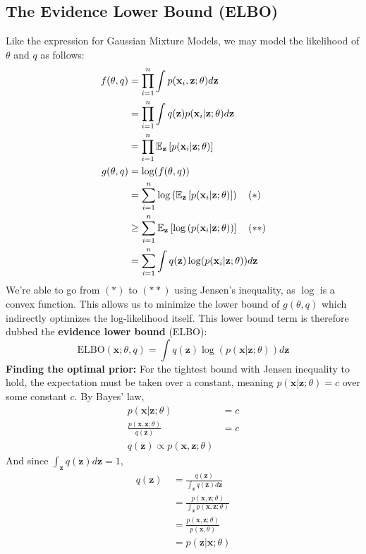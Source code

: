 \subsection{The Evidence Lower Bound (ELBO)}
Like the expression for Gaussian Mixture Models, we may model the likelihood of $\theta$ and $q$ as follows:
\begin{align*}
        f(\theta,q) 
        &= \prod_{i=1}^n \int p(\mathbf{x}_i,\mathbf{z};\theta)d\mathbf{z}\\
        &= \prod_{i=1}^n \int q(\mathbf{z}) p(\mathbf{x}_i|\mathbf{z};\theta)d\mathbf{z}\\
        &= \prod_{i=1}^n \mathbb{E}_\mathbf{z}\left[p(\mathbf{x}_i|\mathbf{z};\theta)\right]\\
        g(\theta,q) 
        &= \log(f(\theta,q)) \\
        &= \sum_{i=1}^n \log\left(\mathbb{E}_\mathbf{z}\left[p(\mathbf{x}_i|\mathbf{z};\theta)\right]\right) \quad (*) \\
        &\ge \sum_{i=1}^n \mathbb{E}_\mathbf{z}\left[\log\left(p(\mathbf{x}_i|\mathbf{z};\theta)\right)\right] \quad (**) \\
        &= \sum_{i=1}^n \int q(\mathbf{z}) \log(p(\mathbf{x}_i|\mathbf{z};\theta)) d\mathbf{z}
\end{align*}
We're able to go from $(*)$ to $(**)$ using Jensen's inequality, as $\log$ is a convex function. This allows us to minimize the lower bound of $g(\theta,q)$ which indirectly optimizes the log-likelihood itself. This lower bound term is therefore dubbed the \textbf{evidence lower bound} (ELBO):
\[
\text{ELBO}(\mathbf{x};\theta,q) = \int q(\mathbf{z}) \log(p(\mathbf{x}|\mathbf{z};\theta)) d\mathbf{z}
\]
\textbf{Finding the optimal prior:} For the tightest bound with Jensen inequality to hold, the expectation must be taken over a constant, meaning $p(\mathbf{x}|\mathbf{z};\theta)=c$ over some constant $c$. By Bayes' law,
\begin{align*}
    p(\mathbf{x}|\mathbf{z};\theta)&=c\\
    \frac{p(\mathbf{x},\mathbf{z};\theta)}{q(\mathbf{z})}&=c\\
    q(\mathbf{z}) \propto p(\mathbf{x},\mathbf{z};\theta)
\end{align*}
And since $\int_{\mathbf{z}} q(\mathbf{z}) d\mathbf{z}=1$,
\begin{align*}
    q(\mathbf{z}) \
    &= \frac{q(\mathbf{z})}{\int_{\mathbf{z}} q(\mathbf{z}) d\mathbf{z}} \\
    &= \frac{p(\mathbf{x},\mathbf{z};\theta)}{\int_{\mathbf{z}} p(\mathbf{x},\mathbf{z};\theta)} \\
    &= \frac{p(\mathbf{x},\mathbf{z};\theta)}{p(\mathbf{x},\theta)} \\
    &= p(\mathbf{z}|\mathbf{x};\theta)
\end{align*}
